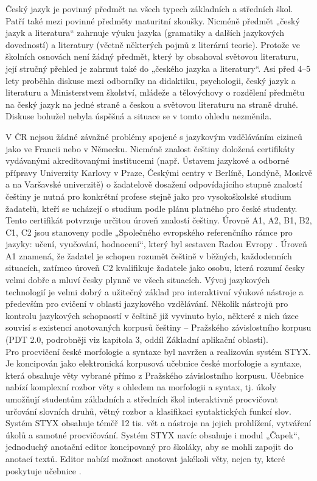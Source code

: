 \begin{multicols}{2}
Český jazyk je povinný předmět na všech typech základních a středních škol. Patří také mezi povinné předměty maturitní zkoušky. Nicméně předmět „český jazyk a literatura“ zahrnuje výuku jazyka (gramatiky a dalších jazykových dovedností) a literatury (včetně některých pojmů z literární teorie). Protože ve školních osnovách není žádný předmět, který by obsahoval světovou literaturu, její stručný přehled je zahrnut také do „českého jazyka a literatury“. Asi před 4–5 lety proběhla diskuse mezi odborníky na didaktiku, psychologii, český jazyk a literaturu a Ministerstvem školství, mládeže a tělovýchovy o rozdělení předmětu na český jazyk na jedné straně a českou a světovou literaturu na straně druhé. Diskuse bohužel nebyla úspěšná a situace se v tomto ohledu nezměnila.

V ČR nejsou žádné závažné problémy spojené s jazykovým vzděláváním cizinců jako ve Francii nebo v Německu. Nicméně znalost češtiny doložená certifikáty vydávanými akreditovanými institucemi (např. Ústavem jazykové a odborné přípravy Univerzity Karlovy v Praze, Českými centry v Berlíně, Londýně, Moskvě a na Varšavské univerzitě) o žadatelově dosažení odpovídajícího stupně znalostí češtiny je nutná pro konkrétní profese stejně jako pro vysokoškolské studium žadatelů, kteří se ucházejí o studium podle plánu platného pro české studenty. Tento certifikát potvrzuje určitou úroveň znalostí češtiny. Úrovně A1, A2, B1, B2, C1, C2 jsou stanoveny podle „Společného evropského referenčního rámce pro jazyky: učení, vyučování, hodnocení“, který byl sestaven Radou Evropy \cite{Note7}. Úroveň A1 znamená, že žadatel je schopen rozumět češtině v běžných, každodenních situacích, zatímco úroveň C2 kvalifikuje žadatele jako osobu, která rozumí česky velmi dobře a mluví česky plynně ve všech situacích. Vývoj jazykových technologií je velmi dobrý a užitečný základ pro interaktivní výukové nástroje a především pro cvičení v oblasti jazykového vzdělávání. Několik nástrojů pro kontrolu jazykových schopností v češtině již vyvinuto bylo, některé z nich úzce souvisí s existencí anotovaných korpusů češtiny – Pražského závislostního korpusu (PDT 2.0, podrobněji viz kapitola 3, oddíl Základní aplikační oblasti).\\
Pro procvičení české morfologie a syntaxe byl navržen a realizován systém STYX. Je koncipován jako elektronická korpusová učebnice české morfologie a syntaxe, která obsahuje věty vybrané přímo z Pražského závislostního korpusu. Učebnice nabízí komplexní rozbor věty s ohledem na morfologii a syntax, tj. úkoly umožňují studentům základních a středních škol interaktivně procvičovat určování slovních druhů, větný rozbor a klasifikaci syntaktických funkcí slov. Systém STYX obsahuje téměř 12 tis. vět a nástroje na jejich prohlížení, vytváření úkolů a samotné procvičování. Systém STYX navíc obsahuje i  modul „Čapek“, jednoduchý anotační editor koncipovaný pro školáky, aby se mohli zapojit do anotací textů. Editor nabízí možnost anotovat jakékoli věty, nejen ty, které poskytuje učebnice \cite{Note8}.\\

\end{multicols}
